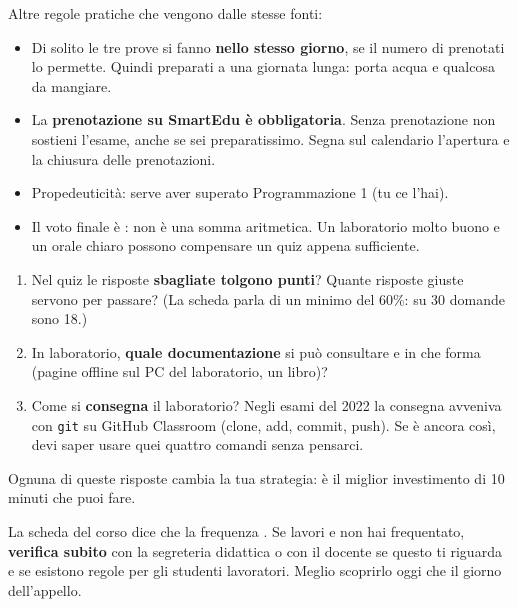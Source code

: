 Altre regole pratiche che vengono dalle stesse fonti:
\begin{itemize}
  \item Di solito le tre prove si fanno \textbf{nello stesso giorno}, se il numero di
        prenotati lo permette. Quindi preparati a una giornata lunga: porta acqua e
        qualcosa da mangiare.
  \item La \textbf{prenotazione su SmartEdu è obbligatoria}. Senza prenotazione non sostieni
        l'esame, anche se sei preparatissimo. Segna sul calendario l'apertura e la
        chiusura delle prenotazioni.
  \item Propedeuticità: serve aver superato Programmazione 1 (tu ce l'hai).
  \item Il voto finale è : non è una somma
        aritmetica. Un laboratorio molto buono e un orale chiaro possono compensare un quiz
        appena sufficiente.
\end{itemize}

\begin{consiglio}
\begin{enumerate}
  \item Nel quiz le risposte \textbf{sbagliate tolgono punti}? Quante risposte giuste
        servono per passare? (La scheda parla di un minimo del 60\%: su 30 domande sono
        18.)
  \item In laboratorio, \textbf{quale documentazione} si può consultare e in che forma
        (pagine offline sul PC del laboratorio, un libro)?
  \item Come si \textbf{consegna} il laboratorio? Negli esami del 2022 la consegna avveniva
        con \texttt{git} su GitHub Classroom (clone, add, commit, push). Se è ancora così,
        devi saper usare quei quattro comandi senza pensarci.
\end{enumerate}
Ognuna di queste risposte cambia la tua strategia: è il miglior investimento di 10 minuti
che puoi fare.
\end{consiglio}

\begin{trappola}
La scheda del corso dice che la frequenza . Se lavori e non hai
frequentato, \textbf{verifica subito} con la segreteria didattica o con il docente se
questo ti riguarda e se esistono regole per gli studenti lavoratori. Meglio scoprirlo
oggi che il giorno dell'appello.
\end{trappola}


